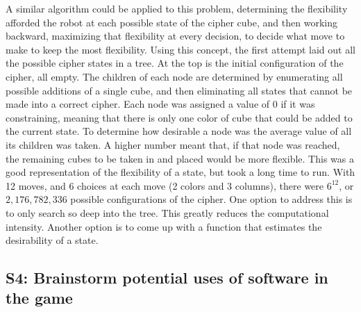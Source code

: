 \documentclass{article}
\begin{document}
A similar algorithm could be applied to this problem, determining the flexibility afforded the robot at each possible state of the cipher cube, and then working backward, maximizing that flexibility at every decision, to decide what move to make to keep the most flexibility. Using this concept, the first attempt laid out all the possible cipher states in a tree. At the top is the initial configuration of the cipher, all empty. The children of each node are determined by enumerating all possible additions of a single cube, and then eliminating all states that cannot be made into a correct cipher. Each node was assigned a value of 0 if it was constraining, meaning that there is only one color of cube that could be added to the current state. To determine how desirable a node was the average value of all its children was taken. A higher number meant that, if that node was reached, the remaining cubes to be taken in and placed would be more flexible. This was a good representation of the flexibility of a state, but took a long time to run. With 12 moves, and 6 choices at each move (2 colors and 3 columns), there were $6^12$, or $2,176,782,336$ possible configurations of the cipher. One option to address this is to only search so deep into the tree. This greatly reduces the computational intensity. Another option is to come up with a function that estimates the desirability of a state.


\subsection{S4: Brainstorm potential uses of software in the game}
\end{document}
